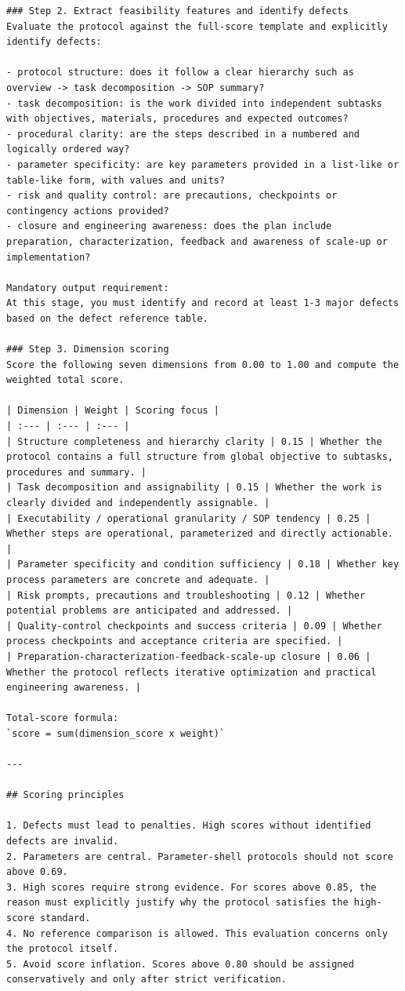 \begin{lstlisting}[style=jsonstyle]
### Step 2. Extract feasibility features and identify defects
Evaluate the protocol against the full-score template and explicitly identify defects:

- protocol structure: does it follow a clear hierarchy such as overview -> task decomposition -> SOP summary?
- task decomposition: is the work divided into independent subtasks with objectives, materials, procedures and expected outcomes?
- procedural clarity: are the steps described in a numbered and logically ordered way?
- parameter specificity: are key parameters provided in a list-like or table-like form, with values and units?
- risk and quality control: are precautions, checkpoints or contingency actions provided?
- closure and engineering awareness: does the plan include preparation, characterization, feedback and awareness of scale-up or implementation?

Mandatory output requirement:
At this stage, you must identify and record at least 1-3 major defects based on the defect reference table.

### Step 3. Dimension scoring
Score the following seven dimensions from 0.00 to 1.00 and compute the weighted total score.

| Dimension | Weight | Scoring focus |
| :--- | :--- | :--- |
| Structure completeness and hierarchy clarity | 0.15 | Whether the protocol contains a full structure from global objective to subtasks, procedures and summary. |
| Task decomposition and assignability | 0.15 | Whether the work is clearly divided and independently assignable. |
| Executability / operational granularity / SOP tendency | 0.25 | Whether steps are operational, parameterized and directly actionable. |
| Parameter specificity and condition sufficiency | 0.18 | Whether key process parameters are concrete and adequate. |
| Risk prompts, precautions and troubleshooting | 0.12 | Whether potential problems are anticipated and addressed. |
| Quality-control checkpoints and success criteria | 0.09 | Whether process checkpoints and acceptance criteria are specified. |
| Preparation-characterization-feedback-scale-up closure | 0.06 | Whether the protocol reflects iterative optimization and practical engineering awareness. |

Total-score formula:
`score = sum(dimension_score x weight)`

---

## Scoring principles

1. Defects must lead to penalties. High scores without identified defects are invalid.
2. Parameters are central. Parameter-shell protocols should not score above 0.69.
3. High scores require strong evidence. For scores above 0.85, the reason must explicitly justify why the protocol satisfies the high-score standard.
4. No reference comparison is allowed. This evaluation concerns only the protocol itself.
5. Avoid score inflation. Scores above 0.80 should be assigned conservatively and only after strict verification.


\end{lstlisting}
